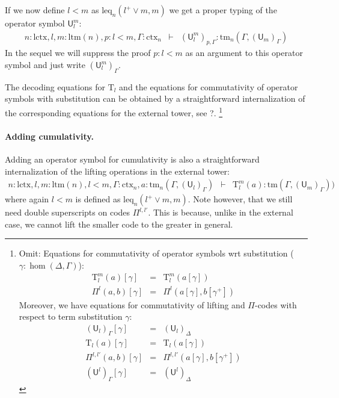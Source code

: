 \documentclass[11pt,a4paper]{article}
\theoremstyle{definition}
\newcommand{\UU}{\mathsf{U}}
\def\UU{\mathsf{U}}
\newcommand{\N}{\mathsf{N}}
\def\lctx{\mathrm{lctx}}
\def\ltm{\mathrm{ltm}}
\def\leq{\mathrm{leq}}
\newcommand{\ctx}{\mathrm{ctx}}
\newcommand{\tm}{\mathrm{tm}}
\def\U{\mathsf{U}}
\newcommand{\Ta}{\mathrm{T}}
\begin{document}
If we now define $l < m$ as $\leq_n(l^+ \vee m, m)$ we get a proper typing of the operator symbol $\UU^m_l$:
\begin{eqnarray*}
n : \lctx, l, m : \ltm(n), p : l < m, \Gamma : \ctx_n&\vdash&(\UU^m_l)_{p,\Gamma} : \tm_n(\Gamma,(\UU_{m})_\Gamma)
\end{eqnarray*}
In the sequel we will suppress the proof $p : l < m$ as an argument to this operator symbol and just write $(\UU^m_l)_{\Gamma}$.

The decoding equations for $\Ta_l$ and the equations for commutativity of operator symbols with substitution can be obtained by a straightforward internalization of the corresponding equations for the external tower, see ?.
\footnote{Omit:
Equations for commutativity of operator symbols wrt substitution ($\gamma : \hom(\Delta,\Gamma)$):
\begin{eqnarray*}
\Ta^m_l(a) [ \gamma ] &=& \Ta^m_l(a[ \gamma ] )\\
\Pi^{l}(a,b)[ \gamma ] &=& \Pi^{l}(a [ \gamma ], b[ \gamma^+ ])
\end{eqnarray*}
Moreover, we have equations for commutativity of lifting and $\Pi$-codes with respect to term substitution $\gamma$:
 \begin{eqnarray*}
(\U_l)_\Gamma [ \gamma ] &=& (\U_l)_\Delta\\
\Ta_l(a) [ \gamma ] &=& \Ta_l(a[ \gamma ] )\\
\Pi^{l,l'}(a,b)[ \gamma ] &=& \Pi^{l,l'}(a [ \gamma ], b[ \gamma^+ ])\\
(\UU^l)_\Gamma[ \gamma ] &=&(\UU^l)_\Delta
\end{eqnarray*}
}

\paragraph{Adding cumulativity.} Adding an operator symbol for cumulativity is also a straightforward internalization of the lifting operations in the external tower:
\begin{eqnarray*}
n : \lctx, l,m : \ltm(n), l < m, \Gamma : \ctx_n, a : \tm_n(\Gamma,(\U_{l})_\Gamma) &\vdash& {\Ta^m_{l}}(a) : \tm(\Gamma,(\U_{m})_\Gamma))
\end{eqnarray*}
where again $l < m$ is defined as $\leq_n(l^+ \vee m, m)$. Note however, that we still need double superscripts on codes $\Pi^{l,l'}$. This is because, unlike in the external case, we cannot lift the smaller code to the greater in general.
\end{document}
